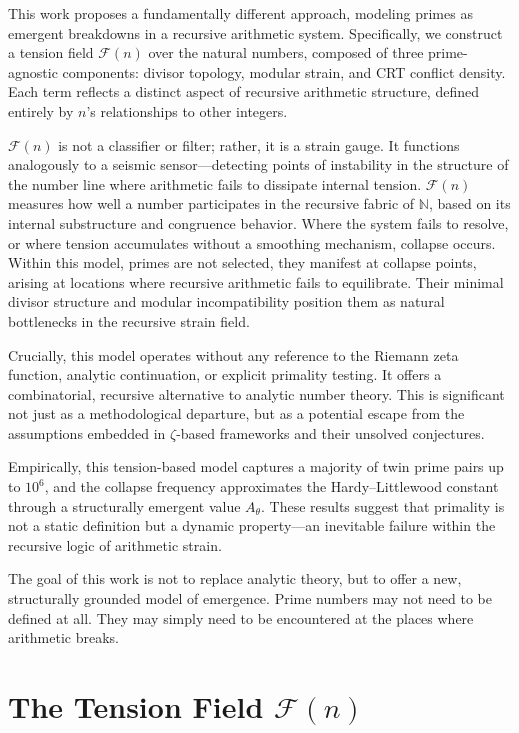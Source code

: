 \documentclass[11pt]{article}
\begin{document}
This work proposes a fundamentally different approach, modeling primes as emergent breakdowns in a recursive arithmetic system. Specifically, we construct a tension field $\mathcal{F}(n)$ over the natural numbers, composed of three prime-agnostic components: divisor topology, modular strain, and CRT conflict density. Each term reflects a distinct aspect of recursive arithmetic structure, defined entirely by $n$’s relationships to other integers.

$\mathcal{F}(n)$ is not a classifier or filter; rather, it is a strain gauge. It functions analogously to a seismic sensor—detecting points of instability in the structure of the number line where arithmetic fails to dissipate internal tension. $\mathcal{F}(n)$ measures how well a number participates in the recursive fabric of $\mathbb{N}$, based on its internal substructure and congruence behavior. Where the system fails to resolve, or where tension accumulates without a smoothing mechanism, collapse occurs. Within this model, primes are not selected, they manifest at collapse points, arising at locations where recursive arithmetic fails to equilibrate. Their minimal divisor structure and modular incompatibility position them as natural bottlenecks in the recursive strain field.

Crucially, this model operates without any reference to the Riemann zeta function, analytic continuation, or explicit primality testing. It offers a combinatorial, recursive alternative to analytic number theory. This is significant not just as a methodological departure, but as a potential escape from the assumptions embedded in $\zeta$-based frameworks and their unsolved conjectures.

Empirically, this tension-based model captures a majority of twin prime pairs up to $10^6$, and the collapse frequency approximates the Hardy–Littlewood constant~\cite{hardy_littlewood} through a structurally emergent value $A_\theta$. These results suggest that primality is not a static definition but a dynamic property—an inevitable failure within the recursive logic of arithmetic strain.

The goal of this work is not to replace analytic theory, but to offer a new, structurally grounded model of emergence. Prime numbers may not need to be defined at all. They may simply need to be encountered at the places where arithmetic breaks.

\section{The Tension Field $\mathcal{F}(n)$}
\end{document}
